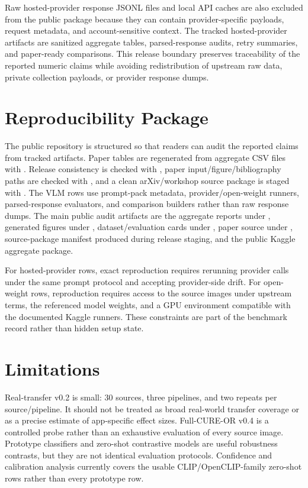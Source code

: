 \documentclass[10pt]{article}
\begin{document}
Raw hosted-provider response JSONL files and local API caches are also excluded from the public package because they can contain provider-specific payloads, request metadata, and account-sensitive context. The tracked hosted-provider artifacts are sanitized aggregate tables, parsed-response audits, retry summaries, and paper-ready comparisons. This release boundary preserves traceability of the reported numeric claims while avoiding redistribution of upstream raw data, private collection payloads, or provider response dumps.

\section{Reproducibility Package}

The public repository is structured so that readers can audit the reported claims from tracked artifacts. Paper tables are regenerated from aggregate CSV files with . Release consistency is checked with , paper input/figure/bibliography paths are checked with , and a clean arXiv/workshop source package is staged with . The VLM rows use prompt-pack metadata, provider/open-weight runners, parsed-response evaluators, and comparison builders rather than raw response dumps. The main public audit artifacts are the aggregate reports under , generated figures under , dataset/evaluation cards under , paper source under , source-package manifest produced during release staging, and the public Kaggle aggregate package.

For hosted-provider rows, exact reproduction requires rerunning provider calls under the same prompt protocol and accepting provider-side drift. For open-weight rows, reproduction requires access to the source images under upstream terms, the referenced model weights, and a GPU environment compatible with the documented Kaggle runners. These constraints are part of the benchmark record rather than hidden setup state.

\section{Limitations}

Real-transfer v0.2 is small: 30 sources, three pipelines, and two repeats per source/pipeline. It should not be treated as broad real-world transfer coverage or as a precise estimate of app-specific effect sizes. Full-CURE-OR v0.4 is a controlled probe rather than an exhaustive evaluation of every source image. Prototype classifiers and zero-shot contrastive models are useful robustness contrasts, but they are not identical evaluation protocols. Confidence and calibration analysis currently covers the usable CLIP/OpenCLIP-family zero-shot rows rather than every prototype row.
\end{document}
